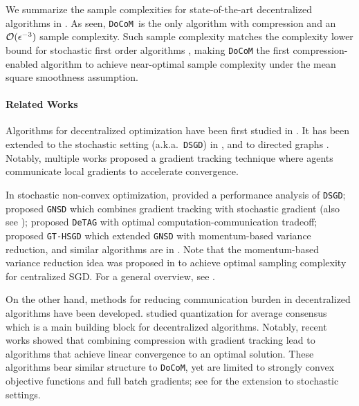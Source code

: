 \documentclass[10pt]{article} %
\newcommand{\revision}{}
\theoremstyle{plain}
\theoremstyle{definition}
\theoremstyle{remark}
\newcommand{\aname}{{\tt DoCoM}}
\newcommand{\redtmp}{}
\begin{document}
We summarize the sample complexities for state-of-the-art decentralized algorithms in . As seen, \aname~is the only algorithm with compression and an ${\cal O}(\epsilon^{-3})$ sample complexity. Such sample complexity matches the complexity lower bound for stochastic first order algorithms \citep{arjevani2019lower}, making {\aname} the first compression-enabled algorithm to achieve near-optimal sample complexity {\revision under the mean square smoothness assumption}.\vspace{0cm}


\paragraph{Related Works}
Algorithms for decentralized optimization have been first studied in \citep{nedic2009distributed}. 
It has been extended to the stochastic setting (a.k.a.~{\tt DSGD}) in \citep{ram2010distributed}, and to directed graphs \citep{tsianos2012push, assran2019stochastic}. Notably, multiple works \citep{qu2017harnessing, di2016next, shi2015extra} proposed a gradient tracking technique where agents communicate  local gradients to accelerate convergence.\vspace{-.1cm} 

In stochastic non-convex optimization,  \citet{lian2017can} provided a performance analysis of {\tt DSGD}; \citet{lu2019gnsd} proposed {\tt GNSD} which combines gradient tracking with stochastic gradient (also see \citep{tang2018d}); \citet{pmlr-v139-lu21a} proposed {\tt DeTAG} with optimal computation-communication tradeoff; \citet{xin2021hybrid} proposed {\tt GT-HSGD} which extended {\tt GNSD} with momentum-based variance reduction, and similar algorithms are in \citep{xin2020variance,zhang2021gt}. Note that the momentum-based variance reduction idea was proposed in \citep{tran2021hybrid, cutkosky2019momentum} to achieve optimal sampling complexity for centralized SGD. For a general overview, see \citep{chang2020distributed}.\vspace{-.1cm}

On the other hand, methods for reducing communication burden in decentralized algorithms have been developed. \citet{aysal2008distributed, kashyap2007quantized, reisizadeh2019exact, saha2021decentralized} studied quantization for average consensus which is a main building block for decentralized algorithms. Notably, recent works \citep{liu2020linear, liao2021compressed, song2021compressed, zhang2021innovation,song2021compressed} showed that combining compression with gradient tracking lead to algorithms that achieve linear convergence to an optimal solution. These algorithms bear similar structure to  \aname, yet are limited to strongly convex objective functions and full batch gradients; {\redtmp see \citep{kovalev2021linearly} for the extension to stochastic settings.}
\end{document}
